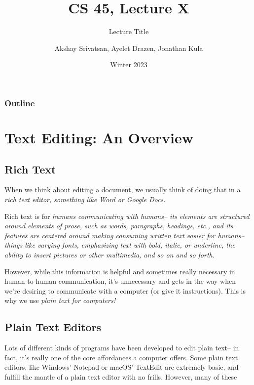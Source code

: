 \usepackage{shared/cs45}

\title{CS 45, Lecture X}
\subtitle{Lecture Title}
\date{Winter 2023}
\author{Akshay Srivatsan, Ayelet Drazen, Jonathan Kula}



\maketitle

\frame{\titlepage}

\begin{frame}
  \frametitle{Outline}
  \tableofcontents[hidesubsections]
\end{frame}

\section{Text Editing: An Overview}
\subsection{Rich Text}

When we think about editing a document, we usually think of doing that in 
a \em{rich text editor}, something like Word or Google Docs.

Rich text is for \em{humans communicating with humans}-- its elements
are structured around elements of prose, such as words, paragraphs,
headings, etc., and its features are centered around making consuming
written text easier for humans-- things like varying fonts, emphasizing
text with bold, italic, or underline, the ability to insert pictures
or other multimedia, and so on and so forth.

However, while this information is helpful and sometimes really necessary
in human-to-human communication, it's unnecessary and gets in the way when
we're desiring to communicate with a computer (or give it instructions).
This is why we use \em{plain text} for computers!

\subsection{Plain Text Editors}

Lots of different kinds of programs have been developed to edit plain text--
in fact, it's really one of the core affordances a computer offers. Some
plain text editors, like Windows' Notepad or macOS' TextEdit are extremely
basic, and fulfill the mantle of a plain text editor with no frills.
However, many of these 



